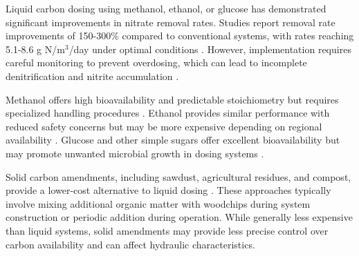 \documentclass[12pt,a4paper]{article}
\begin{document}
 

Liquid carbon dosing using methanol, ethanol, or glucose has demonstrated significant improvements in nitrate removal rates.  Studies report removal rate improvements of 150-300\% compared to conventional systems, with rates reaching 5.1-8.6 g N/m$^3$/day under optimal conditions \citep{RN632}. However, implementation requires careful monitoring to prevent overdosing, which can lead to incomplete denitrification and nitrite accumulation \citep{RN632}.

 Methanol offers high bioavailability and predictable stoichiometry but requires specialized handling procedures \citep{RN632}. Ethanol provides similar performance with reduced safety concerns but may be more expensive depending on regional availability \citep{RN632}. Glucose and other simple sugars offer excellent bioavailability but may promote unwanted microbial growth in dosing systems \citep{RN632}.

 Solid carbon amendments, including sawdust, agricultural residues, and compost, provide a lower-cost alternative to liquid dosing \citep{RN632}. These approaches typically involve mixing additional organic matter with woodchips during system construction or periodic addition during operation. While generally less expensive than liquid systems, solid amendments may provide less precise control over carbon availability and can affect hydraulic characteristics.
\end{document}
